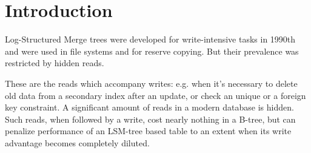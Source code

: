 \documentclass{vldb}
\begin{document}




\section{Introduction}
Log-Structured Merge trees were developed for write-intensive tasks in 1990th
and were used in file systems and for reserve copying. But their prevalence was
restricted by hidden reads.

These are the reads which accompany writes: e.g. when it’s necessary to delete
old data from a secondary index after an update, or check an unique or a foreign
key constraint. A significant amount of reads in a modern database is hidden.
Such reads, when followed by a write, cost nearly nothing in a B-tree, but can
penalize performance of an LSM-tree based table to an extent when its write
advantage becomes completely diluted.
\end{document}
